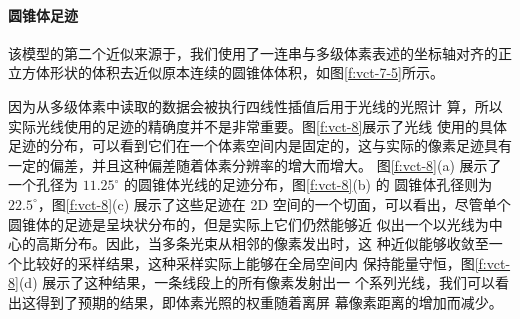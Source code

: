\paragraph{圆锥体足迹}
该模型的第二个近似来源于，我们使用了一连串与多级体素表述的坐标轴对齐的正立方体形状的体积去近似原本连续的圆锥体体积，如图\ref{f:vct-7-5}所示。

因为从多级体素中读取的数据会被执行四线性插值后用于光线的光照计 算，所以实际光线使用的足迹的精确度并不是非常重要。图\ref{f:vct-8}展示了光线 使用的具体足迹的分布，可以看到它们在一个体素空间内是固定的，这与实际的像素足迹具有一定的偏差，并且这种偏差随着体素分辨率的增大而增大。 图\ref{f:vct-8}(a) 展示了一个孔径为 $11.25^{\circ}$ 的圆锥体光线的足迹分布，图\ref{f:vct-8}(b) 的 圆锥体孔径则为 $22.5^{\circ}$，图\ref{f:vct-8}(c) 展示了这些足迹在 2D 空间的一个切面，可以看出，尽管单个圆锥体的足迹是呈块状分布的，但是实际上它们仍然能够近 似出一个以光线为中心的高斯分布。因此，当多条光束从相邻的像素发出时，这 种近似能够收敛至一个比较好的采样结果，这种采样实际上能够在全局空间内 保持能量守恒，图\ref{f:vct-8}(d) 展示了这种结果，一条线段上的所有像素发射出一 个系列光线，我们可以看出这得到了预期的结果，即体素光照的权重随着离屏 幕像素距离的增加而减少。

